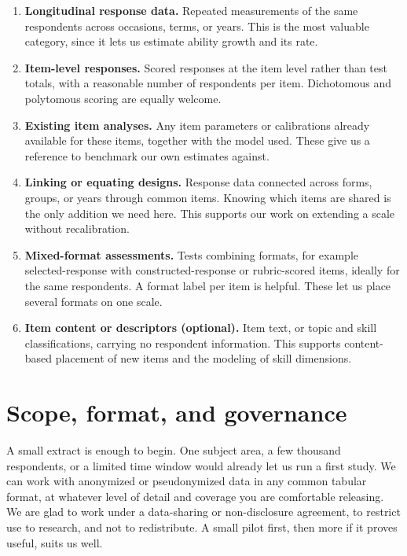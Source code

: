 \documentclass[11pt]{article}
\begin{document}
\begin{enumerate}
  \item \textbf{Longitudinal response data.} Repeated measurements of the
  same respondents across occasions, terms, or years. This is the most
  valuable category, since it lets us estimate ability growth and its
  rate.

  \item \textbf{Item-level responses.} Scored responses at the item level
  rather than test totals, with a reasonable number of respondents per
  item. Dichotomous and polytomous scoring are equally welcome.

  \item \textbf{Existing item analyses.} Any item parameters or
  calibrations already available for these items, together with the model
  used. These give us a reference to benchmark our own estimates against.

  \item \textbf{Linking or equating designs.} Response data connected
  across forms, groups, or years through common items. Knowing which items
  are shared is the only addition we need here. This supports our work on
  extending a scale without recalibration.

  \item \textbf{Mixed-format assessments.} Tests combining formats, for
  example selected-response with constructed-response or rubric-scored
  items, ideally for the same respondents. A format label per item is
  helpful. These let us place several formats on one scale.

  \item \textbf{Item content or descriptors (optional).} Item text, or
  topic and skill classifications, carrying no respondent information.
  This supports content-based placement of new items and the modeling of
  skill dimensions.
\end{enumerate}

\section*{Scope, format, and governance}

A small extract is enough to begin. One subject area, a few thousand
respondents, or a limited time window would already let us run a first
study. We can work with anonymized or pseudonymized data in any common
tabular format, at whatever level of detail and coverage you are
comfortable releasing. We are glad to work under a data-sharing or
non-disclosure agreement, to restrict use to research, and not to
redistribute. A small pilot first, then more if it proves useful, suits us
well.
\end{document}

